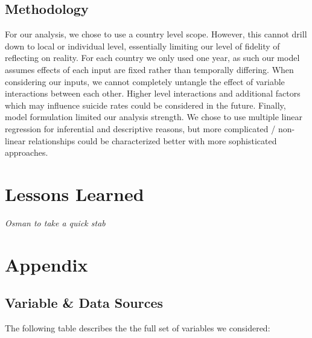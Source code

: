 \documentclass[]{article}
\begin{document}
\subsection{Methodology}\label{methodology}

For our analysis, we chose to use a country level scope. However, this
cannot drill down to local or individual level, essentially limiting our
level of fidelity of reflecting on reality. For each country we only
used one year, as such our model assumes effects of each input are fixed
rather than temporally differing. When considering our inputs, we cannot
completely untangle the effect of variable interactions between each
other. Higher level interactions and additional factors which may
influence suicide rates could be considered in the future. Finally,
model formulation limited our analysis strength. We chose to use
multiple linear regression for inferential and descriptive reasons, but
more complicated / non-linear relationships could be characterized
better with more sophisticated approaches.

\section{Lessons Learned}\label{lessons-learned}

\emph{Osman to take a quick stab}

\newpage 

\section{Appendix}\label{appendix}

\subsection{Variable \& Data Sources}\label{variable-data-sources}

The following table describes the the full set of variables we
considered:
\end{document}
